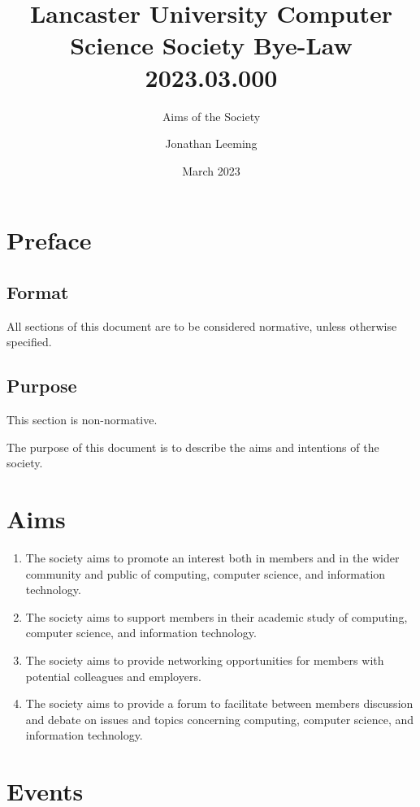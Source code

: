 \documentclass{scrartcl}
\title{Lancaster University Computer Science Society Bye-Law 2023.03.000}
\subtitle{Aims of the Society}
\author{Jonathan Leeming}
\date{March 2023}
\begin{document}
    \maketitle
    
    \clearpage
    \tableofcontents

    \clearpage
    \section{Preface}
        \label{preface}
        \subsection{Format}
            \label{preface--format}
            All sections of this document are to be considered normative, unless otherwise specified.

        \subsection{Purpose}
            \label{preface--purpose}
            This section is non-normative.

            The purpose of this document is to describe the aims and intentions of the society.

    \clearpage
    \section{Aims}
        \label{aims}
        \begin{enumerate}
            \item The society aims to promote an interest both in members and in the wider community and public of computing, computer science, and information technology.
            \item The society aims to support members in their academic study of computing, computer science, and information technology.
            \item The society aims to provide networking opportunities for members with potential colleagues and employers.
            \item The society aims to provide a forum to facilitate between members discussion and debate on issues and topics concerning computing, computer science, and information technology.
        \end{enumerate}

    \clearpage
    \section{Events}
        \label{events}
\end{document}
